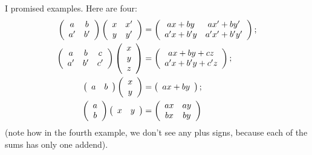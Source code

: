 \documentclass[numbers=enddot,12pt,final,onecolumn,notitlepage]{scrartcl}%
\theoremstyle{definition}
\begin{document}
I promised examples. Here are four:%
\begin{align*}
\left(
\begin{array}
[c]{cc}%
a & b\\
a^{\prime} & b^{\prime}%
\end{array}
\right)  \left(
\begin{array}
[c]{cc}%
x & x^{\prime}\\
y & y^{\prime}%
\end{array}
\right)   &  =\left(
\begin{array}
[c]{cc}%
ax+by & ax^{\prime}+by^{\prime}\\
a^{\prime}x+b^{\prime}y & a^{\prime}x^{\prime}+b^{\prime}y^{\prime}%
\end{array}
\right)  ;\\
\left(
\begin{array}
[c]{ccc}%
a & b & c\\
a^{\prime} & b^{\prime} & c^{\prime}%
\end{array}
\right)  \left(
\begin{array}
[c]{c}%
x\\
y\\
z
\end{array}
\right)   &  =\left(
\begin{array}
[c]{c}%
ax+by+cz\\
a^{\prime}x+b^{\prime}y+c^{\prime}z
\end{array}
\right)  ;\\
\left(
\begin{array}
[c]{cc}%
a & b
\end{array}
\right)  \left(
\begin{array}
[c]{c}%
x\\
y
\end{array}
\right)   &  =\left(
\begin{array}
[c]{c}%
ax+by
\end{array}
\right)  ;\\
\left(
\begin{array}
[c]{c}%
a\\
b
\end{array}
\right)  \left(
\begin{array}
[c]{cc}%
x & y
\end{array}
\right)   &  =\left(
\begin{array}
[c]{cc}%
ax & ay\\
bx & by
\end{array}
\right)
\end{align*}
(note how in the fourth example, we don't see any plus signs, because each of
the sums has only one addend).
\end{document}

